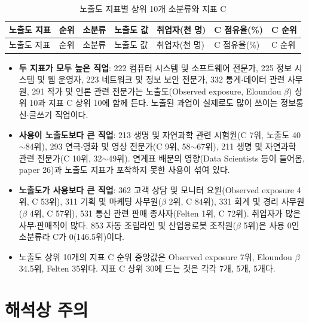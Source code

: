 \documentclass[11pt]{article}
\begin{document}
\begin{longtable}{L{2.6cm}R{0.8cm}L{5.4cm}R{1.4cm}R{1.6cm}R{1.6cm}R{1.4cm}}
\caption{노출도 지표별 상위 10개 소분류와 지표 C}\label{tab:topexpo}\\
\toprule
노출도 지표 & 순위 & 소분류 & 노출도 값 & 취업자(천 명) & C 점유율(\%) & C 순위 \\
\midrule
\endfirsthead
\toprule
노출도 지표 & 순위 & 소분류 & 노출도 값 & 취업자(천 명) & C 점유율(\%) & C 순위 \\
\midrule
\endhead

\bottomrule
\end{longtable}

\begin{itemize}[leftmargin=*]
  \item \textbf{두 지표가 모두 높은 직업}: 222 컴퓨터 시스템 및 소프트웨어 전문가, 225 정보 시스템 및 웹 운영자, 223 네트워크 및 정보 보안 전문가, 332 통계$\cdot$데이터 관련 사무원, 291 작가 및 언론 관련 전문가는 노출도(Observed exposure, Eloundou $\beta$) 상위 10과 지표 C 상위 10에 함께 든다. 노출된 과업이 실제로도 많이 쓰이는 정보통신$\cdot$글쓰기 직업이다.
  \item \textbf{사용이 노출도보다 큰 직업}: 213 생명 및 자연과학 관련 시험원(C 7위, 노출도 40$\sim$84위), 293 연극$\cdot$영화 및 영상 전문가(C 9위, 58$\sim$67위), 211 생명 및 자연과학 관련 전문가(C 10위, 32$\sim$49위). 연계표 배분의 영향(Data Scientists 등이 들어옴, paper 26)과 노출도 지표가 포착하지 못한 사용이 섞여 있다.
  \item \textbf{노출도가 사용보다 큰 직업}: 362 고객 상담 및 모니터 요원(Observed exposure 4위, C 53위), 311 기획 및 마케팅 사무원($\beta$ 2위, C 84위), 331 회계 및 경리 사무원($\beta$ 4위, C 57위), 531 통신 관련 판매 종사자(Felten 1위, C 72위). 취업자가 많은 사무$\cdot$판매직이 많다. 853 자동 조립라인 및 산업용로봇 조작원($\beta$ 5위)은 사용 0인 소분류라 C가 0(146.5위)이다.
  \item 노출도 상위 10개의 지표 C 순위 중앙값은 Observed exposure 7위, Eloundou $\beta$ 34.5위, Felten 35위다. 지표 C 상위 30에 드는 것은 각각 7개, 5개, 5개다.
\end{itemize}

\section{해석상 주의}
\end{document}
